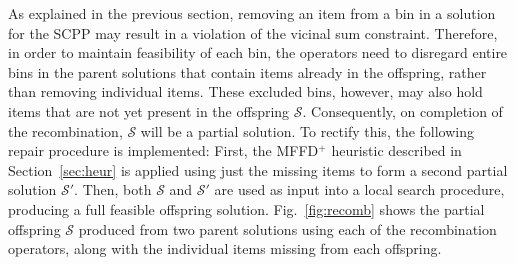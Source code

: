 \documentclass[a4paper,11pt,authoryear]{elsarticle}
\begin{document}
\noindent As explained in the previous section, removing an item from a bin in a solution for the SCPP may result in a violation of the vicinal sum constraint. Therefore, in order to maintain feasibility of each bin, the operators need to disregard entire bins in the parent solutions that contain items already in the offspring, rather than removing individual items. These excluded bins, however, may also hold items that are not yet present in the offspring $\mathcal{S}$. Consequently, on completion of the recombination, $\mathcal{S}$ will be a partial solution. To rectify this, the following repair procedure is implemented: First, the MFFD$^+$ heuristic described in Section~\ref{sec:heur} is applied using just the missing items to form a second partial solution $\mathcal{S}'$. Then, both $\mathcal{S}$ and $\mathcal{S}'$ are used as input into a local search procedure, producing a full feasible offspring solution. Fig.~\ref{fig:recomb} shows the partial offspring $\mathcal{S}$ produced from two parent solutions using each of the recombination operators, along with the individual items missing from each offspring.
\end{document}
